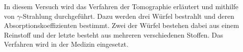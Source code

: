 In diesem Versuch wird das Verfahren der Tomographie erläutert und mithilfe von $\gamma$-Strahlung durchgeführt.
Dazu werden drei Würfel bestrahlt und deren Absorptionskoeffizienten bestimmt.
Zwei der Würfel bestehen dabei aus einem Reinstoff und der letzte besteht aus mehreren verschiedenen Stoffen.
Das Verfahren wird in der Medizin eingesetzt.